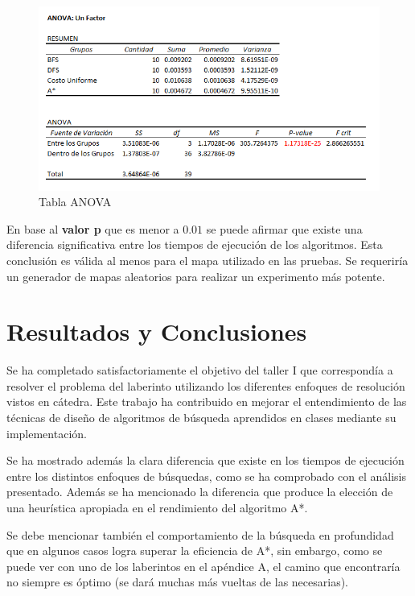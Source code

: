 \documentclass[letter, titlepage, 10pt]{article}
\begin{document}
\begin{figure}[H]
    \begin{center}
        \includegraphics[scale = 0.5]{images/ANOVA}
        \caption{Tabla ANOVA}
    \end{center}
\end{figure}

En base al \textbf{valor p} que es menor a $0.01$ se puede afirmar que existe una diferencia significativa entre los tiempos de ejecución de los algoritmos. Esta conclusión es válida al menos para el mapa utilizado en las pruebas. Se requeriría un generador de mapas aleatorios para realizar un experimento más potente.

\newpage
\section{Resultados y Conclusiones}
Se ha completado satisfactoriamente el objetivo del taller I que correspondía a resolver el problema del laberinto utilizando los diferentes enfoques de resolución vistos en cátedra. Este trabajo ha contribuido en mejorar el entendimiento de las técnicas de diseño de algoritmos de búsqueda aprendidos en clases mediante su implementación.

Se ha mostrado además la clara diferencia que existe en los tiempos de ejecución entre los distintos enfoques de búsquedas, como se ha comprobado con el análisis presentado.  Además se ha mencionado la diferencia que produce la elección de una heurística apropiada en el rendimiento del algoritmo A*. 

Se debe mencionar también el comportamiento de la búsqueda en profundidad que en algunos casos logra superar la eficiencia de A*, sin embargo, como se puede ver con uno de los laberintos en el apéndice A, el camino que encontraría no siempre es óptimo (se dará muchas más vueltas de las necesarias).
\end{document}
